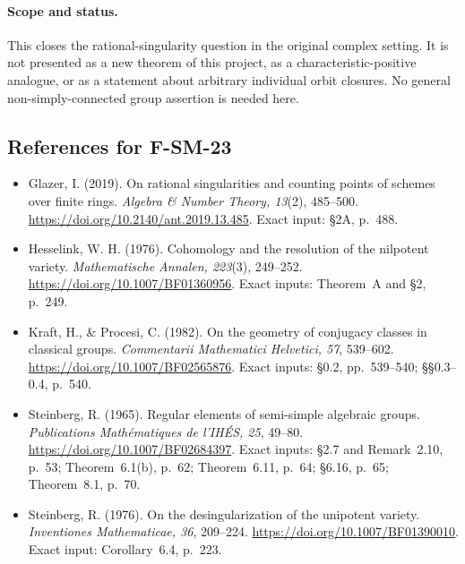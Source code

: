 \paragraph{Scope and status.}
This closes the rational-singularity question in the original
complex setting.  It is not presented as a new theorem of this
project, as a characteristic-positive analogue, or as a statement
about arbitrary individual orbit closures.  No general
non-simply-connected group assertion is needed here.

\subsection*{References for F-SM-23}
\begin{itemize}
\item Glazer, I. (2019). On rational singularities and counting points
of schemes over finite rings. \emph{Algebra \& Number Theory, 13}(2),
485--500. \url{https://doi.org/10.2140/ant.2019.13.485}.
Exact input: \S2A, p.~488.
\item Hesselink, W. H. (1976). Cohomology and the resolution of the
nilpotent variety. \emph{Mathematische Annalen, 223}(3), 249--252.
\url{https://doi.org/10.1007/BF01360956}.
Exact inputs: Theorem~A and \S2, p.~249.
\item Kraft, H., \& Procesi, C. (1982). On the geometry of conjugacy
classes in classical groups. \emph{Commentarii Mathematici
Helvetici, 57}, 539--602.
\url{https://doi.org/10.1007/BF02565876}.
Exact inputs: \S0.2, pp.~539--540; \S\S0.3--0.4, p.~540.
\item Steinberg, R. (1965). Regular elements of semi-simple algebraic
groups. \emph{Publications Math\'ematiques de l'IH\'ES, 25}, 49--80.
\url{https://doi.org/10.1007/BF02684397}.
Exact inputs: \S2.7 and Remark~2.10, p.~53;
Theorem~6.1(b), p.~62; Theorem~6.11, p.~64;
\S6.16, p.~65; Theorem~8.1, p.~70.
\item Steinberg, R. (1976). On the desingularization of the unipotent
variety. \emph{Inventiones Mathematicae, 36}, 209--224.
\url{https://doi.org/10.1007/BF01390010}.
Exact input: Corollary~6.4, p.~223.
\end{itemize}
